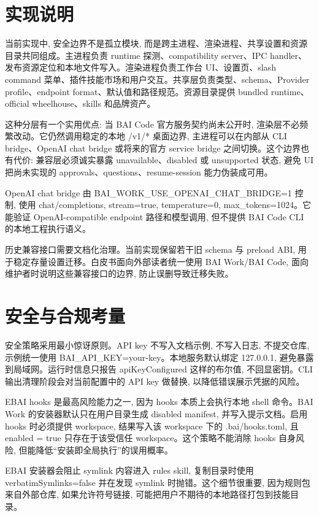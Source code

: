 \section{实现说明}
当前实现中, 安全边界不是孤立模块, 而是跨主进程、渲染进程、共享设置和资源目录共同组成。主进程负责 runtime 探测、compatibility server、IPC handler、发布资源定位和本地文件写入。渲染进程负责工作台 UI、设置页、slash command 菜单、插件技能市场和用户交互。共享层负责类型、schema、Provider profile、endpoint format、默认值和路径规范。资源目录提供 bundled runtime、official wheelhouse、skills 和品牌资产。

这种分层有一个实用优点: 当 BAI Code 官方服务契约尚未公开时, 渲染层不必频繁改动。它仍然调用稳定的本地 /v1/* 桌面边界, 主进程可以在内部从 CLI bridge、OpenAI chat bridge 或将来的官方 service bridge 之间切换。这个边界也有代价: 兼容层必须诚实暴露 unavailable、disabled 或 unsupported 状态, 避免 UI 把尚未实现的 approvals、questions、resume-session 能力伪装成可用。

OpenAI chat bridge 由 BAI\_WORK\_USE\_OPENAI\_CHAT\_BRIDGE=1 控制, 使用 chat/completions, stream=true, temperature=0, max\_tokens=1024。它能验证 OpenAI-compatible endpoint 路径和模型调用, 但不提供 BAI Code CLI 的本地工程执行语义。

历史兼容接口需要文档化治理。当前实现保留若干旧 schema 与 preload ABI, 用于稳定存量设置迁移。白皮书面向外部读者统一使用 BAI Work/BAI Code, 面向维护者时说明这些兼容接口的边界, 防止误删导致迁移失败。

\section{安全与合规考量}
安全策略采用最小惊讶原则。API key 不写入文档示例, 不写入日志, 不提交仓库, 示例统一使用 BAI\_API\_KEY=your-key。本地服务默认绑定 127.0.0.1, 避免暴露到局域网。运行时信息只报告 apiKeyConfigured 这样的布尔值, 不回显密钥。CLI 输出清理阶段会对当前配置中的 API key 做替换, 以降低错误展示凭据的风险。

EBAI hooks 是最高风险能力之一, 因为 hooks 本质上会执行本地 shell 命令。BAI Work 的安装器默认只在用户目录生成 disabled manifest, 并写入提示文档。启用 hooks 时必须提供 workspace, 结果写入该 workspace 下的 .bai/hooks.toml, 且 enabled = true 只存在于该受信任 workspace。这个策略不能消除 hooks 自身风险, 但能降低“安装即全局执行”的误用概率。

EBAI 安装器会阻止 symlink 内容进入 rules skill, 复制目录时使用 verbatimSymlinks=false 并在发现 symlink 时抛错。这个细节很重要, 因为规则包来自外部仓库, 如果允许符号链接, 可能把用户不期待的本地路径打包到技能目录。

